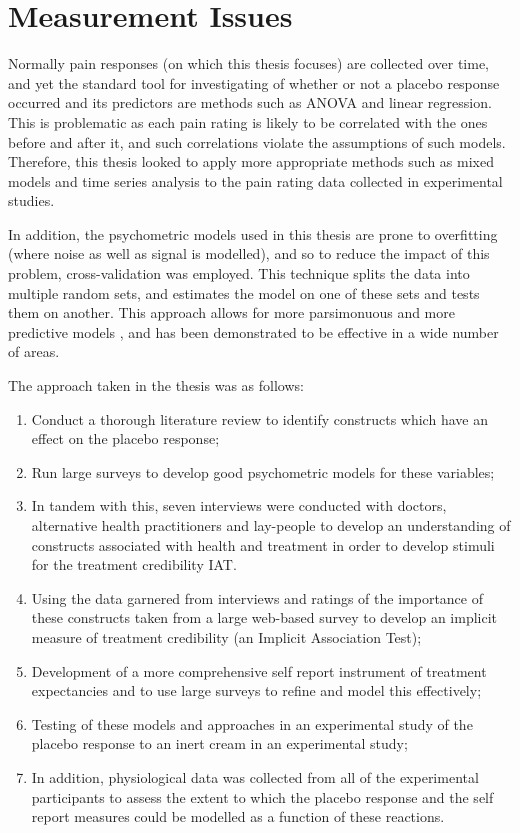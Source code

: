\documentclass{article}
\begin{document}
\section{Measurement Issues}
\label{sec:measurement-issues}

Normally pain responses (on which this thesis focuses) are collected over time, and yet the standard tool for investigating of whether or not a placebo response occurred and its predictors are methods such as ANOVA and linear regression. This is problematic as each pain rating is likely to be correlated with the ones before and after it, and such correlations violate the assumptions of such models. Therefore, this thesis looked to apply more appropriate methods such as mixed models and time series analysis to the pain rating data collected in experimental studies. 

In addition, the psychometric models used in this thesis are prone to overfitting (where noise as well as signal is modelled), and so to reduce the impact of this problem, cross-validation was employed. This technique splits the data into multiple random sets, and estimates the model on one of these sets and tests them on another. This approach allows for more parsimonuous and more predictive models \citep{friedman2009elements}, and has been demonstrated to be effective in a wide number of areas. 

The approach taken in the thesis was as follows:
\begin{enumerate}
\item Conduct a thorough literature review to identify constructs which have an effect on the placebo response;

\item Run large surveys to develop good psychometric models for these variables;

\item In tandem with this, seven interviews were conducted with doctors, alternative health practitioners and lay-people to develop an understanding of constructs associated with health and treatment in order to develop stimuli for the treatment credibility IAT. 

\item Using the data garnered from interviews and ratings of the importance of these constructs taken from a large web-based survey to develop an implicit measure of treatment credibility (an Implicit Association Test);

\item Development of a more comprehensive self report instrument of treatment expectancies and to use large surveys to refine and model this effectively;

\item Testing of these models and approaches in an experimental study of the placebo response to an inert cream in an experimental study;

\item In addition, physiological data was collected from all of the experimental participants to assess the extent to which the placebo response and the self report measures could be modelled as a function of these reactions.
\end{enumerate}
\end{document}
